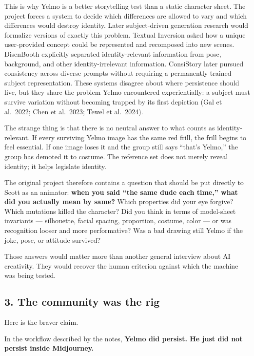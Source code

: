 \documentclass[
]{article}
\begin{document}
This is why Yelmo is a better storytelling test than a static character
sheet. The project forces a system to decide which differences are
allowed to vary and which differences would destroy identity. Later
subject-driven generation research would formalize versions of exactly
this problem. Textual Inversion asked how a unique user-provided concept
could be represented and recomposed into new scenes. DisenBooth
explicitly separated identity-relevant information from pose,
background, and other identity-irrelevant information. ConsiStory later
pursued consistency across diverse prompts without requiring a
permanently trained subject representation. These systems disagree about
where persistence should live, but they share the problem Yelmo
encountered experientially: a subject must survive variation without
becoming trapped by its first depiction (Gal et al.~2022; Chen et
al.~2023; Tewel et al.~2024).

The strange thing is that there is no neutral answer to what counts as
identity-relevant. If every surviving Yelmo image has the same red
frill, the frill begins to feel essential. If one image loses it and the
group still says ``that's Yelmo,'' the group has demoted it to costume.
The reference set does not merely reveal identity; it helps legislate
identity.

The original project therefore contains a question that should be put
directly to Scott as an animator: \textbf{when you said ``the same dude
each time,'' what did you actually mean by same?} Which properties did
your eye forgive? Which mutations killed the character? Did you think in
terms of model-sheet invariants --- silhouette, facial spacing,
proportion, costume, color --- or was recognition looser and more
performative? Was a bad drawing still Yelmo if the joke, pose, or
attitude survived?

Those answers would matter more than another general interview about AI
creativity. They would recover the human criterion against which the
machine was being tested.

\subsection{3. The community was the
rig}\label{the-community-was-the-rig}

Here is the braver claim.

In the workflow described by the notes, \textbf{Yelmo did persist. He
just did not persist inside Midjourney.}
\end{document}
